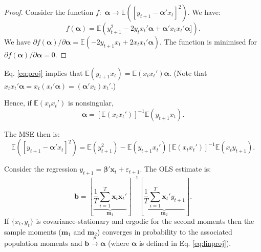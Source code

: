\documentclass[
  11pt,
]{book}
\theoremstyle{definition}
\theoremstyle{definition}
\theoremstyle{definition}
\theoremstyle{definition}
\theoremstyle{remark}
\begin{document}
\begin{proof}
Consider the function \(f:\) \(\boldsymbol\alpha \rightarrow \mathbb{E}\left( [y_{t+1} - \boldsymbol\alpha'x_t]^2 \right)\). We have:
\[
f(\boldsymbol\alpha) = \mathbb{E}\left( y_{t+1}^2 - 2 y_t x_t'\boldsymbol\alpha + \boldsymbol\alpha'x_t x_t'\boldsymbol\alpha] \right).
\]
We have \(\partial f(\boldsymbol\alpha)/\partial \boldsymbol\alpha = \mathbb{E}(-2 y_{t+1} x_t + 2 x_t x_t'\boldsymbol\alpha)\). The function is minimised for \(\partial f(\boldsymbol\alpha)/\partial \boldsymbol\alpha =0\).
\end{proof}

Eq. \eqref{eq:proj} implies that \(\mathbb{E}\left( y_{t+1}x_t \right)=\mathbb{E}\left(x_tx_t' \right)\boldsymbol\alpha\). (Note that \(x_t x_t'\boldsymbol\alpha=x_t (x_t'\boldsymbol\alpha)=(\boldsymbol\alpha'x_t) x_t'\).)

Hence, if \(\mathbb{E}\left(x_tx_t' \right)\) is nonsingular,
\begin{equation}
\boldsymbol\alpha=[\mathbb{E}\left(x_tx_t' \right)]^{-1}\mathbb{E}\left( y_{t+1}x_t \right).\label{eq:linproj}
\end{equation}

The MSE then is:
\[
\mathbb{E}([y_{t+1} - \boldsymbol\alpha'x_t]^2) = \mathbb{E}{(y_{t+1}^2)} - \mathbb{E}\left( y_{t+1}x_t' \right)[\mathbb{E}\left(x_tx_t' \right)]^{-1}\mathbb{E}\left(x_ty_{t+1} \right).
\]

Consider the regression \(y_{t+1} = \boldsymbol\beta'\mathbf{x}_t + \varepsilon_{t+1}\). The OLS estimate is:
\[
\mathbf{b} = \left[ \underbrace{ \frac{1}{T} \sum_{i=1}^T \mathbf{x}_t\mathbf{x}_t'}_{\mathbf{m}_1} \right]^{-1}\left[  \underbrace{ \frac{1}{T} \sum_{i=1}^T \mathbf{x}_t'y_{t+1}}_{\mathbf{m}_2} \right].
\]
If \(\{x_t,y_t\}\) is covariance-stationary and ergodic for the second moments then the sample moments (\(\mathbf{m}_1\) and \(\mathbf{m}_2\)) converges in probability to the associated population moments and \(\mathbf{b} \overset{p}{\rightarrow} \boldsymbol\alpha\) (where \(\boldsymbol\alpha\) is defined in Eq. \eqref{eq:linproj}).
\end{document}

